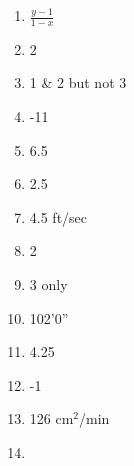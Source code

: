 \documentclass[../uilmath.tex]{subfiles}
\begin{document}
\begin{enumerate}[label=\bfseries\arabic*.]
    \item %
    $\frac{y-1}{1-x}$

    \item %
    2

    \item %
    1 \& 2 but not 3 

    \item %
    -11

    \item %
    6.5

    \item %
    2.5

    \item %
    4.5 ft/sec 

    \item %
    2

    \item %
    3 only 

    \item %
    102'0''

    \item %
    4.25

    \item %
    -1

    \item %
    126 cm$^2$/min 

    \item %
    
\end{enumerate}
\end{document}
